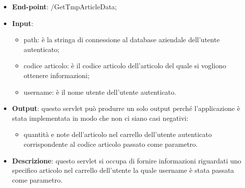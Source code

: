 
\begin{itemize}
	\item \textbf{End-point}: /GetTmpArticleData;
	\item \textbf{Input}:
		\begin{itemize}
			\item path: è la stringa di connessione al database aziendale dell'utente autenticato;
			\item codice articolo: è il codice articolo dell'articolo del quale si vogliono ottenere informazioni;
			\item username: è il nome utente dell'utente autenticato.
		\end{itemize}
	\item \textbf{Output}: questo servlet può produrre un solo output perché l'applicazione è stata implementata in modo che non ci siano casi negativi:
		\begin{itemize}
			\item quantità e note dell'articolo nel carrello dell'utente autenticato corrispondente al codice articolo passato come parametro.
		\end{itemize}
	\item \textbf{Descrizione}: questo servlet si occupa di fornire informazioni riguardati uno specifico articolo nel carrello dell'utente la quale username è stata passata come parametro.
\end{itemize}


